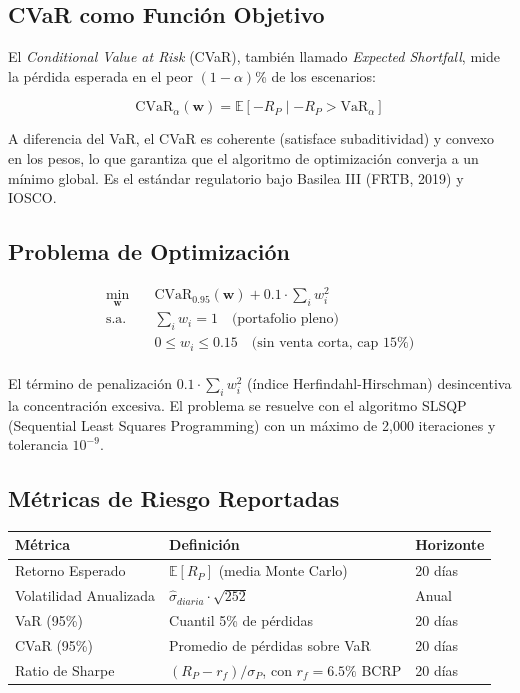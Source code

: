 \documentclass[11pt,a4paper]{article}
\begin{document}
\subsection{CVaR como Función Objetivo}

El \textit{Conditional Value at Risk} (CVaR), también llamado \textit{Expected Shortfall},
mide la pérdida esperada en el peor $(1-\alpha)$\% de los escenarios:

\begin{equation}
    \text{CVaR}_\alpha(\mathbf{w}) = \mathbb{E}\left[-R_P \mid -R_P > \text{VaR}_\alpha\right]
\end{equation}

A diferencia del VaR, el CVaR es coherente (satisface subaditividad) y convexo en los pesos,
lo que garantiza que el algoritmo de optimización converja a un mínimo global. Es el estándar
regulatorio bajo Basilea III (FRTB, 2019) y IOSCO.

\subsection{Problema de Optimización}

\begin{equation}
\begin{aligned}
    \min_{\mathbf{w}} \quad & \text{CVaR}_{0.95}(\mathbf{w}) + 0.1 \cdot \sum_i w_i^2 \\
    \text{s.a.} \quad & \sum_i w_i = 1 \quad \text{(portafolio pleno)} \\
                     & 0 \leq w_i \leq 0.15 \quad \text{(sin venta corta, cap 15\%)} \\
\end{aligned}
\end{equation}

El término de penalización $0.1 \cdot \sum_i w_i^2$ (índice Herfindahl-Hirschman) desincentiva
la concentración excesiva. El problema se resuelve con el algoritmo SLSQP (Sequential
Least Squares Programming) con un máximo de 2{,}000 iteraciones y tolerancia $10^{-9}$.

\subsection{Métricas de Riesgo Reportadas}

\begin{center}
\begin{tabular}{lll}
\toprule
\rowcolor{lightgray}
Métrica & Definición & Horizonte \\
\midrule
Retorno Esperado & $\mathbb{E}[R_P]$ (media Monte Carlo) & 20 días \\
Volatilidad Anualizada & $\hat{\sigma}_{diaria} \cdot \sqrt{252}$ & Anual \\
VaR (95\%) & Cuantil 5\% de pérdidas & 20 días \\
CVaR (95\%) & Promedio de pérdidas sobre VaR & 20 días \\
Ratio de Sharpe & $(R_P - r_f) / \sigma_P$, con $r_f = 6.5\%$ BCRP & 20 días \\
\bottomrule
\end{tabular}
\end{center}
\end{document}

